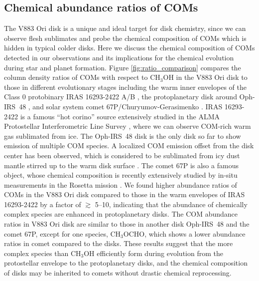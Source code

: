 \documentclass[linenumbers, twocolumn, twocolappendix, astrosymb, times]{aastex631}
\newcommand{\methanol}{CH$_3$OH\xspace}
\newcommand{\methylformate}{CH$_3$OCHO\xspace}
\begin{document}
\subsection{Chemical abundance ratios of COMs}\label{subsec:abundance_ratio}
The V883 Ori disk is a unique and ideal target for disk chemistry, since we can observe flesh sublimates and probe the chemical composition of COMs which is hidden in typical colder disks. Here we discuss the chemical composition of COMs detected in our observations and its implications for the chemical evolution during star and planet formation. 
Figure \ref{fig:ratio_comparison} compares the column density ratios of COMs with respect to \methanol in the V883 Ori disk to those in different evolutionary stages including the warm inner envelopes of the Class 0 protobinary IRAS 16293-2422 A/B \citep[][see also \citealt{Drozdovskaya2019}]{Lykke2017, Jorgensen2018, Manigand2020, Manigand2021}, the protoplanetary disk around Oph-IRS~48 \citep{Brunken2022}, and solar system comet 67P/Churyumov-Gerasimenko \citep[][see also \citealt{Drozdovskaya2019}]{Rubin2019, Schuhmann2019}. IRAS 16293-2422 is a famous ``hot corino'' source extensively studied in the ALMA Protostellar Interferometric Line Survey \citep[PILS,][]{Jorgensen2016}, where we can observe COM-rich warm gas sublimated from ice. The Oph-IRS~48 disk is the only disk so far to show emission of multiple COM species. A localized COM emission offset from the disk center has been observed, which is considered to be sublimated from icy dust mantle stirred up to the warm disk surface \citep{vanderMarel2021, Brunken2022}. The comet 67P is also a famous object, whose chemical composition is recently extensively studied by in-situ measurements in the Rosetta mission \citep{Altwegg2019}. We found higher abundance ratios of COMs in the V883 Ori disk compared to those in the warm envelopes of IRAS 16293-2422 by a factor of $\gtrsim$ 5--10, indicating that the abundance of chemically complex species are enhanced in protoplanetary disks. The COM abundance ratios in V883 Ori disk are similar to those in another disk Oph-IRS~48 and the comet 67P, except for one species, \methylformate, which shows a lower abundance ratios in comet compared to the disks. These results suggest that the more complex species than \methanol efficiently form during evolution from the protostellar envelope to the protoplanetary disks, and the chemical composition of disks may be inherited to comets without drastic chemical reprocessing. 
\end{document}
